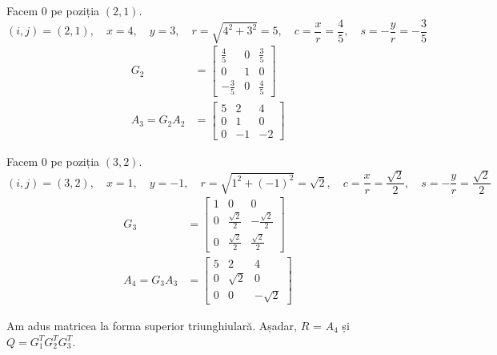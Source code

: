 \documentclass{exam}
\begin{document}
Facem 0 pe poziția $(2, 1)$.
\begin{equation*}
	(i, j) = (2, 1), \quad x = 4, \quad y = 3, \quad r = \sqrt{4^2 + 3^2} = 5, \quad c = \frac{x}{r} = \frac{4}{5}, \quad s = -\frac{y}{r} = -\frac{3}{5}
\end{equation*}
\begin{align*}
	G_2           & = \begin{bmatrix}
		                  \frac{4}{5}  & 0 & \frac{3}{5} \\
		                  0            & 1 & 0           \\
		                  -\frac{3}{5} & 0 & \frac{4}{5}
	                  \end{bmatrix} \\
	A_3 = G_2 A_2 & = \begin{bmatrix}
		                  5 & 2  & 4  \\
		                  0 & 1  & 0  \\
		                  0 & -1 & -2
	                  \end{bmatrix}
\end{align*}

Facem 0 pe poziția $(3, 2)$.
\begin{equation*}
	(i, j) = (3, 2), \quad x = 1, \quad y = -1, \quad r = \sqrt{1^2 + (-1)^2} = \sqrt{2}, \quad c = \frac{x}{r} = \frac{\sqrt{2}}{2}, \quad s = -\frac{y}{r} = \frac{\sqrt{2}}{2}
\end{equation*}
\begin{align*}
	G_3           & = \begin{bmatrix}
		                  1 & 0                  & 0                   \\
		                  0 & \frac{\sqrt{2}}{2} & -\frac{\sqrt{2}}{2} \\
		                  0 & \frac{\sqrt{2}}{2} & \frac{\sqrt{2}}{2}
	                  \end{bmatrix} \\
	A_4 = G_3 A_3 & = \begin{bmatrix}
		                  5 & 2        & 4         \\
		                  0 & \sqrt{2} & 0         \\
		                  0 & 0        & -\sqrt{2}
	                  \end{bmatrix}
\end{align*}

Am adus matricea la forma superior triunghiulară. Așadar, $R$ = $A_4$ și $Q = G_1^T G_2^T G_3^T$.
\end{document}
